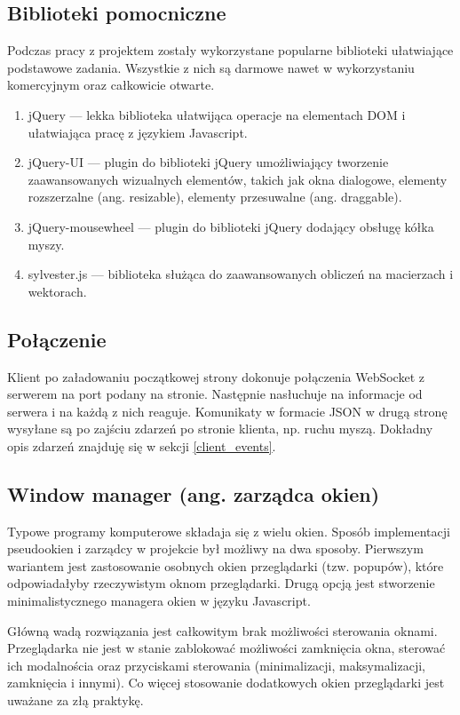 \subsection{Biblioteki pomocniczne}
Podczas pracy z projektem zostały wykorzystane popularne biblioteki ułatwiające podstawowe zadania. Wszystkie z nich są darmowe nawet w wykorzystaniu komercyjnym oraz całkowicie otwarte.
\begin{enumerate}
  \item jQuery --- lekka biblioteka ułatwijąca operacje na elementach DOM i ułatwiająca pracę z językiem Javascript.
  \item jQuery-UI --- plugin do biblioteki jQuery umożliwiający tworzenie zaawansowanych wizualnych elementów, takich jak okna dialogowe, elementy rozszerzalne (ang. resizable), elementy przesuwalne (ang. draggable).
  \item jQuery-mousewheel --- plugin do biblioteki jQuery dodający obsługę kółka myszy.
  \item sylvester.js --- biblioteka służąca do zaawansowanych obliczeń na macierzach i wektorach.
\end{enumerate}


\subsection{Połączenie}
Klient po załadowaniu początkowej strony dokonuje połączenia WebSocket z serwerem na port podany na stronie. Następnie nasłuchuje na informacje od serwera i na każdą z nich reaguje. Komunikaty w formacie JSON w drugą stronę wysyłane są po zajściu zdarzeń po stronie klienta, np. ruchu myszą. Dokładny opis zdarzeń znajduję się w sekcji \ref{client_events}.

\subsection{Window manager (ang. zarządca okien)}
Typowe programy komputerowe składaja się z wielu okien. Sposób implementacji pseudookien i zarządcy w projekcie był możliwy na dwa sposoby.
Pierwszym wariantem jest zastosowanie osobnych okien przeglądarki (tzw. popupów), które odpowiadałyby rzeczywistym oknom przeglądarki.
Drugą opcją jest stworzenie minimalistycznego managera okien w języku Javascript.

Główną wadą rozwiązania jest całkowitym brak możliwości sterowania oknami. Przeglądarka nie jest w stanie zablokować możliwości zamknięcia okna, sterować ich modalnościa oraz przyciskami sterowania (minimalizacji, maksymalizacji, zamknięcia i innymi). Co więcej stosowanie dodatkowych okien przeglądarki jest uważane za złą praktykę.

